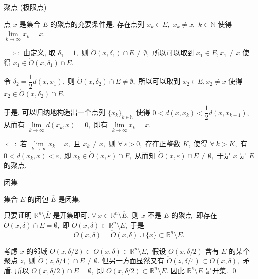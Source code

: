 \begin{frame}{聚点 (极限点)}

\begin{thm}
点 $x$ 是集合 $E$ 的聚点的充要条件是, 存在点列 $x_k \in E,$ $x_k \neq x,$ $k \in \mathbb{N}$ 使得 $\lim\limits_{k\to\infty} x_k = x.$
\end{thm}

\vspace{0.5em}
\pause

\startproof[bg=yellow, fg=red]
\vspace{0.5em}

$\implies:$ 由定义, 取 $\delta_1 = 1,$ 则 $\mathring{O}(x, \delta_1) \cap E \neq \emptyset,$ 所以可以取到 $x_1 \in E, x_1 \neq x$ 使得 $x_1 \in \mathring{O}(x, \delta_1) \cap E.$

令 $\delta_2 = \dfrac{1}{2} d(x, x_1),$ 则 $\mathring{O}(x, \delta_2) \cap E \neq \emptyset,$ 所以可以取到 $x_2 \in E, x_2 \neq x$ 使得 $x_2 \in \mathring{O}(x, \delta_2) \cap E.$

于是, 可以归纳地构造出一个点列 $\{x_k\}_{k\in\mathbb{N}}$ 使得 $0 < d(x, x_k) < \dfrac{1}{2} d(x, x_{k-1}),$ 从而有 $\lim\limits_{k\to\infty} d(x_k, x) = 0,$ 即有 $\lim\limits_{k\to\infty} x_k = x.$

\pause
\vspace{0.5em}

$\Longleftarrow:$ 若 $\lim\limits_{k\to\infty} x_k = x,$ 且 $x_k \neq x,$ 则 $\forall~\varepsilon > 0,$ 存在正整数 $K,$ 使得 $\forall~k > K,$ 有 $0 < d(x_k, x) < \varepsilon,$ 即 $x_k \in \mathring{O}(x, \varepsilon) \cap E,$ 从而知 $\mathring{O}(x, \varepsilon) \cap E \neq \emptyset,$ 于是 $x$ 是 $E$ 的聚点.

\end{frame}


\begin{frame}{闭集}

\begin{prop}
集合 $E$ 的闭包 $\overline{E}$ 是闭集.
\end{prop}

\pause
\vspace{1em}

\startproof[bg=yellow, fg=red]
只要证明 $\mathbb{R}^n \setminus \overline{E}$ 是开集即可.
\pause
$\forall~x \in \mathbb{R}^n \setminus \overline{E},$ 则 $x$ 不是 $E$ 的聚点, 即存在 $\mathring{O}(x, \delta) \cap E = \emptyset,$ 即 $\mathring{O}(x, \delta) \subset \mathbb{R}^n \setminus E,$ 于是
\[O(x, \delta) = \mathring{O}(x, \delta) \cup \{x\} \subset \mathbb{R}^n \setminus E.\]

\pause

考虑 $x$ 的邻域 $O(x, \delta / 2) \subset O(x, \delta) \subset \mathbb{R}^n \setminus E,$
假设 $O(x, \delta / 2)$ 含有 $E$ 的某个聚点 $z,$ 则 $\mathring{O}(z, \delta / 4) \cap E \neq \emptyset.$
但另一方面显然又有 $\mathring{O}(z, \delta / 4) \subset O(x, \delta),$ 矛盾. 所以 $O(x, \delta / 2) \cap \overline{E} = \emptyset,$
即 $O(x, \delta / 2) \subset \mathbb{R}^n \setminus \overline{E}.$ 因此 $\mathbb{R}^n \setminus \overline{E}$ 是开集.
\qed

\end{frame}

